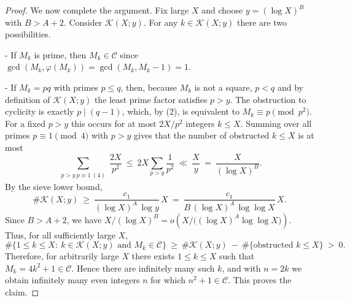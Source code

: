 \begin{proof}
We now complete the argument. Fix large $X$ and choose $y=(\log X)^B$ with $B>A+2$. Consider $\mathcal K(X;y)$. For any $k\in\mathcal K(X;y)$ there are two possibilities.

- If $M_k$ is prime, then $M_k\in\mathcal C$ since $\gcd(M_k,\varphi(M_k))=\gcd(M_k,M_k-1)=1$.

- If $M_k=pq$ with primes $p\le q$, then, because $M_k$ is not a square, $p<q$ and by definition of $\mathcal K(X;y)$ the least prime factor satisfies $p>y$. The obstruction to cyclicity is exactly $p\mid(q-1)$, which, by (2), is equivalent to $M_k\equiv p\pmod{p^2}$. For a fixed $p>y$ this occurs for at most $2X/p^2$ integers $k\le X$. Summing over all primes $p\equiv1\pmod4$ with $p>y$ gives that the number of obstructed $k\le X$ is at most
$$
\sum_{\substack{p>y\ p\equiv1\ (4)}} \frac{2X}{p^2}\ \le\ 2X\sum_{p>y}\frac{1}{p^2}\ \ll\ \frac{X}{y}\ =\ \frac{X}{(\log X)^B}.
$$
By the sieve lower bound,
$$
\#\mathcal K(X;y)\ \ge\ \frac{c_1}{(\log X)^{A}\,\log y}\,X\ =\ \frac{c_1}{B\,(\log X)^{A}\,\log\log X}\,X.
$$
Since $B>A+2$, we have $X/(\log X)^B=o\!\left(X/\bigl((\log X)^A\log\log X\bigr)\right)$. Thus, for all sufficiently large $X$,
$$
\#\{1\le k\le X:\ k\in\mathcal K(X;y)\text{ and }M_k\in\mathcal C\}
\ \ge\ \#\mathcal K(X;y)\ -\ \#\{\text{obstructed }k\le X\}
\ >\ 0.
$$
Therefore, for arbitrarily large $X$ there exists $1\le k\le X$ such that $M_k=4k^2+1\in\mathcal C$. Hence there are infinitely many such $k$, and with $n=2k$ we obtain infinitely many even integers $n$ for which $n^2+1\in\mathcal C$. This proves the claim. 
\end{proof}
